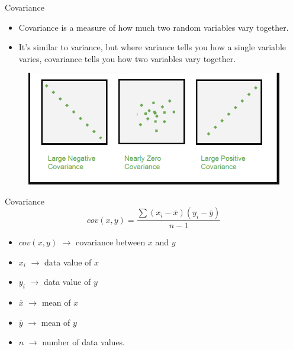 \begin{frame}[t]{Covariance}
	\begin{itemize}
		\item Covariance is a measure of how much two random variables vary 
		together.
		\item 	It’s similar to variance, but where variance tells you how a 
		single variable varies, covariance tells you how two variables vary 
		together.
	\end{itemize}

\begin{figure} [ht]
	\centering
\includegraphics[trim={1cm 1cm 1cm 0}, clip, scale=0.4]{eda/cov.png}
\end{figure}
	 
\end{frame}
\begin{frame}[t]{Covariance}
	$$
	cov(x,y) = \frac{\sum{(x_i - \overline{x})(y_i - \overline{y})}}{n-1}	
	$$
	\begin{itemize}
		\item $cov(x,y)$ $\rightarrow$ covariance between $x$ and $y$
		\item $x_i$ $ \rightarrow$ data value of $x$
		\item $y_i$ $\rightarrow$ data value of $y$
		\item $\overline{x}$ $\rightarrow$  mean of $x$
		\item $\overline{y}$ $\rightarrow$ mean of $y$
		\item $n$ $\rightarrow$ number of data values. 
	\end{itemize}
	
	
\end{frame}

